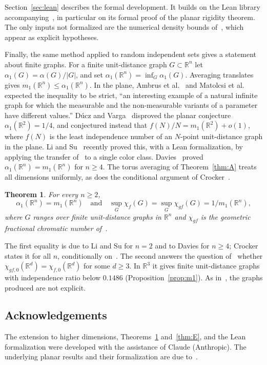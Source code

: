 \documentclass[11pt]{amsart}
\newtheorem{theorem}{Theorem}[section]
\theoremstyle{definition}
\newcommand{\R}{\mathbb{R}}
\begin{document}
Section~\ref{sec:lean} describes the formal development. It builds on the Lean library accompanying~\cite{OAI}, in particular on its formal proof of the planar rigidity theorem. The only inputs not formalized are the numerical density bounds of~\cite{DOV}, which appear as explicit hypotheses.

Finally, the same method applied to random independent sets gives a statement about finite graphs. For a finite unit-distance graph $G\subset\R^n$ let $\alpha_1(G)=\alpha(G)/|G|$, and set $\alpha_1(\R^n)=\inf_G\alpha_1(G)$. Averaging translates gives $m_1(\R^n)\le\alpha_1(\R^n)$. In the plane, Ambrus et al.~\cite{ACMVZ} and Matolcsi et al.~\cite{MRVZ} expected the inequality to be strict, ``an interesting example of a natural infinite graph for which the measurable and the non-measurable variants of a parameter have different values.'' D\'ucz and Varga~\cite{DV} disproved the planar conjecture $\alpha_1(\R^2)=1/4$, and conjectured instead that $f(N)/N=m_1(\R^2)+o(1)$, where $f(N)$ is the least independence number of an $N$-point unit-distance graph in the plane. Li and Su~\cite{LS} recently proved this, with a Lean formalization, by applying the transfer of~\cite{OAI} to a single color class. Davies~\cite{Davies} proved $\alpha_1(\R^n)=m_1(\R^n)$ for $n\ge4$. The torus averaging of Theorem~\ref{thm:A} treats all dimensions uniformly, as does the conditional argument of Crocker~\cite{Crocker}.

\begin{theorem}\label{thm:D}
For every $n\ge2$,
\[
\alpha_1(\R^n)=m_1(\R^n)\quad\text{and}\quad\sup_{G}\chi_f(G)=\sup_G\chi_{gf}(G)=1/m_1(\R^n),
\]
where $G$ ranges over finite unit-distance graphs in $\R^n$ and $\chi_{gf}$ is the geometric fractional chromatic number of~\cite{ACMVZ,MRVZ}.
\end{theorem}

The first equality is due to Li and Su for $n=2$ and to Davies for $n\ge4$; Crocker~\cite{Crocker} states it for all $n$, conditionally on~\cite[Theorem 2.3]{OAI}. The second answers the question of~\cite{MRVZ} whether $\chi_{gf,0}(\R^d)=\chi_{f,0}(\R^d)$ for some $d\ge3$. In $\R^3$ it gives finite unit-distance graphs with independence ratio below $0.1486$ (Proposition~\ref{prop:m1}). As in~\cite{DV,LS}, the graphs produced are not explicit.

\subsection*{Acknowledgements}
The extension to higher dimensions, Theorems~\ref{thm:D} and~\ref{thm:E}, and the Lean formalization were developed with the assistance of Claude (Anthropic). The underlying planar results and their formalization are due to~\cite{OAI}.
\end{document}

